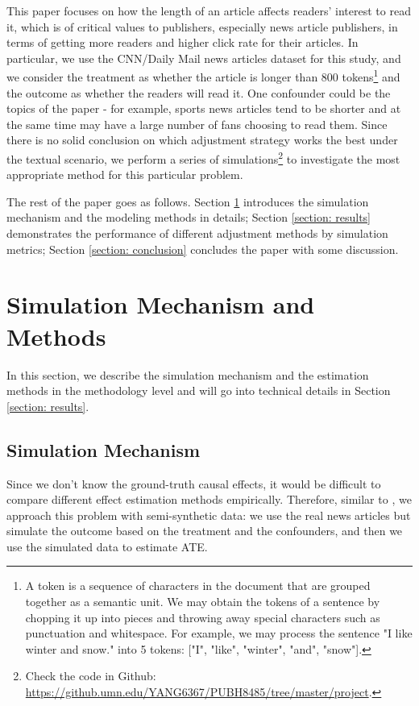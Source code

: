 \documentclass{article}
\begin{document}
	This paper focuses on how the length of an article affects readers' interest to read it, which is of critical values to publishers, especially news article publishers, in terms of getting more readers and higher click rate for their articles. In particular, we use the CNN/Daily Mail news articles dataset \parencite{nallapati2016abstractive} for this study, and we consider the treatment as whether the article is longer than 800 tokens\footnote{A token is a sequence of characters in the document that are grouped together as a semantic unit. We may obtain the tokens of a sentence by chopping it up into pieces and throwing away special characters such as punctuation and whitespace. For example, we may process the sentence "I like winter and snow." into 5 tokens: ["I", "like", "winter", "and", "snow"].} and the outcome as whether the readers will read it. One confounder could be the topics of the paper - for example, sports news articles tend to be shorter and at the same time may have a large number of fans choosing to read them. Since there is no solid conclusion on which adjustment strategy works the best under the textual scenario, we perform a series of simulations\footnote{Check the code in Github: \url{https://github.umn.edu/YANG6367/PUBH8485/tree/master/project}.} to investigate the most appropriate method for this particular problem.
	
	The rest of the paper goes as follows. Section \ref{section: methods} introduces the simulation mechanism and the modeling methods in details; Section \ref{section: results} demonstrates the performance of different adjustment methods by simulation metrics; Section \ref{section: conclusion} concludes the paper with some discussion.
	
	\section{Simulation Mechanism and Methods}\label{section: methods}
	In this section, we describe the simulation mechanism and the estimation methods in the methodology level and will go into technical details in Section \ref{section: results}. 
	\subsection{Simulation Mechanism}
	Since we don't know the ground-truth causal effects, it would be difficult to compare different effect estimation methods empirically. Therefore, similar to \cite{veitch2020adapting}, we approach this problem with semi-synthetic data: we use the real news articles but simulate the outcome based on the treatment and the confounders, and then we use the simulated data to estimate ATE.
	
\end{document}
